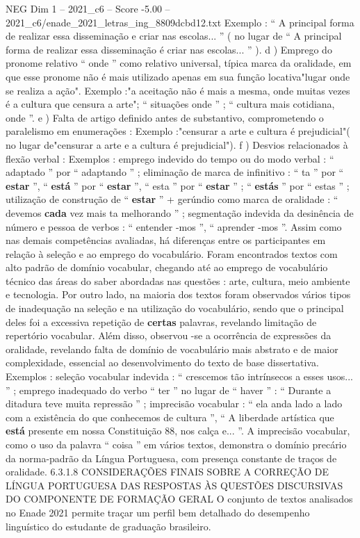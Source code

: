 \begin{textsample}{NEG Dim 1 – 2021\_c6 – Score -5.00 – 2021\_c6/enade\_2021\_letras\_ing\_8809dcbd12.txt}
Exemplo : “ A principal forma de realizar essa disseminação e criar nas escolas... ” ( no lugar de “ A principal forma de realizar essa disseminação é criar nas escolas... ” ). d ) Emprego do pronome relativo “ onde ” como relativo universal, típica marca da oralidade, em que esse pronome não é mais utilizado apenas em sua função locativa"lugar onde se realiza a ação".
Exemplo :"a aceitação não é mais a mesma, onde muitas vezes é a cultura que censura a arte"; “ situações onde ” ; “ cultura mais cotidiana, onde ”. e ) Falta de artigo definido antes de substantivo, comprometendo o paralelismo em enumerações : Exemplo :"censurar a arte e cultura é prejudicial"( no lugar de"censurar a arte e a cultura é prejudicial"). f ) Desvios relacionados à flexão verbal : Exemplos : emprego indevido do tempo ou do modo verbal : “ adaptado ” por “ adaptando ” ; eliminação de marca de infinitivo : “ ta ” por “ \textbf{estar} ”, “ \textbf{está} ” por “ \textbf{estar} ”, “ esta ” por “ \textbf{estar} ” ; “ \textbf{estás} ” por “ estas ” ; utilização de construção de “ \textbf{estar} ” + gerúndio como marca de oralidade : “ devemos \textbf{cada} vez mais ta melhorando ” ; segmentação indevida da desinência de número e pessoa de verbos : “ entender -mos ”, “ aprender -mos ”.
Assim como nas demais competências avaliadas, há diferenças entre os participantes em relação à seleção e ao emprego do vocabulário.
Foram encontrados textos com alto padrão de domínio vocabular, chegando até ao emprego de vocabulário técnico das áreas do saber abordadas nas questões : arte, cultura, meio ambiente e tecnologia.
Por outro lado, na maioria dos textos foram observados vários tipos de inadequação na seleção e na utilização do vocabulário, sendo que o principal deles foi a excessiva repetição de \textbf{certas} palavras, revelando limitação de repertório vocabular.
Além disso, observou -se a ocorrência de expressões da oralidade, revelando falta de domínio de vocabulário mais abstrato e de maior complexidade, essencial ao desenvolvimento do texto de base dissertativa.
Exemplos : seleção vocabular indevida : “ crescemos tão intrínsecos a esses usos... ” ; emprego inadequado do verbo “ ter ” no lugar de “ haver ” : “ Durante a ditadura teve muita repressão ” ; imprecisão vocabular : “ ela anda lado a lado com a existência do que conhecemos de cultura ”, “ A liberdade artística que \textbf{está} presente em nossa Constituição 88, nos calça e... ”.
A imprecisão vocabular, como o uso da palavra “ coisa ” em vários textos, demonstra o domínio precário da norma-padrão da Língua Portuguesa, com presença constante de traços de oralidade. 6.3.1.8 CONSIDERAÇÕES FINAIS SOBRE A CORREÇÃO DE LÍNGUA PORTUGUESA DAS RESPOSTAS ÀS QUESTÕES DISCURSIVAS DO COMPONENTE DE FORMAÇÃO GERAL O conjunto de textos analisados no Enade 2021 permite traçar um perfil bem detalhado do desempenho linguístico do estudante de graduação brasileiro.

\end{textsample}
